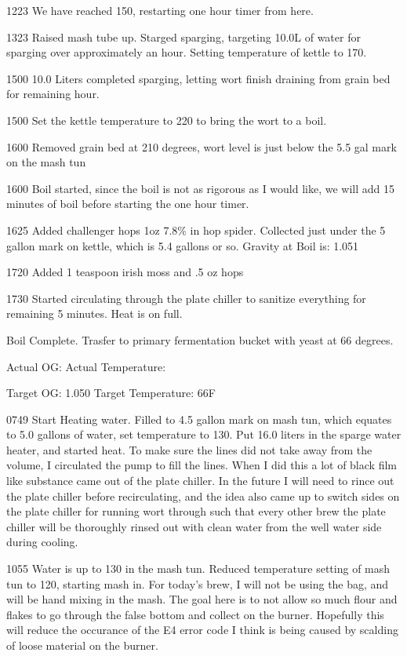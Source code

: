 1223 We have reached 150, restarting one hour timer from here.

1323 Raised mash tube up. Starged sparging, targeting 10.0L of water for sparging over approximately an hour.  Setting temperature of kettle to 170.

1500 10.0 Liters completed sparging, letting wort finish draining from grain bed for remaining hour.

1500 Set the kettle temperature to 220 to bring the wort to a boil.

1600 Removed grain bed at 210 degrees, wort level is just below the 5.5 gal mark on the mash tun

1600 Boil started, since the boil is not as rigorous as I would like, we will add 15 minutes of boil before starting the one hour timer.

1625 Added challenger hops 1oz 7.8\% in hop spider.  Collected just under the 5 gallon mark on kettle, which is 5.4 gallons or so.  Gravity at Boil is: 1.051

1720 Added 1 teaspoon irish moss and .5 oz hops

1730 Started circulating through the plate chiller to sanitize everything for remaining 5 minutes.  Heat is on full.

Boil Complete.  Trasfer to primary fermentation bucket with yeast at 66 degrees.

Actual OG: 
Actual Temperature: 

Target OG: 1.050
Target Temperature: 66F

\def\todaysdate{20191229}
\newday{\todaysdate}\label{\todaysdate}

\FloatBarrier{}
0749 Start Heating water.  Filled to 4.5 gallon mark on mash tun, which equates to 5.0 gallons of water, set temperature to 130.  Put 16.0 liters in the sparge water heater, and started heat.  To make sure the lines did not take away from the volume, I circulated the pump to fill the lines.  When I did this a lot of black film like substance came out of the plate chiller.  In the future I will need to rince out the plate chiller before recirculating, and the idea also came up to switch sides on the plate chiller for running wort through such that every other brew the plate chiller will be thoroughly rinsed out with clean water from the well water side during cooling.

1055 Water is up to 130 in the mash tun. Reduced temperature setting of mash tun to 120, starting mash in.  For today's brew, I will not be using the bag, and will be hand mixing in the mash.  The goal here is to not allow so much flour and flakes to go through the false bottom and collect on the burner.  Hopefully this will reduce the occurance of the E4 error code I think is being caused by scalding of loose material on the burner.

